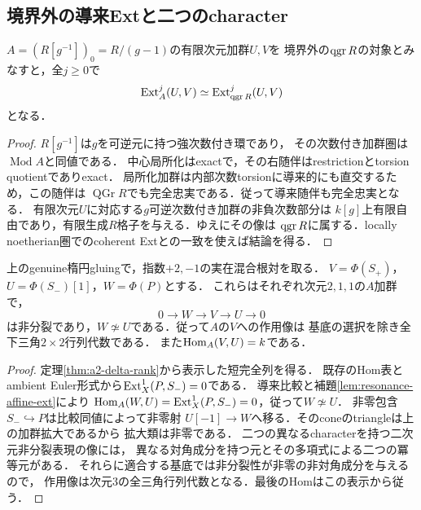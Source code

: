 \subsection{境界外の導来Extと二つのcharacter}
\begin{lemma}[中心局所化による導来Extの保存]
\label{lem:resonance-affine-ext}
$A=(R[g^{-1}])_0=R/(g-1)$の有限次元加群$U,V$を
境界外の$\operatorname{qgr} R$の対象とみなすと，全$j\ge0$で
\[
\operatorname{Ext}^j_A(U,V)\simeq\operatorname{Ext}^j_{\operatorname{qgr} R}(U,V)
\]
となる．
\end{lemma}
\begin{proof}
$R[g^{-1}]$は$g$を可逆元に持つ強次数付き環であり，
その次数付き加群圏は$\operatorname{Mod}A$と同値である．
中心局所化はexactで，その右随伴はrestrictionとtorsion quotientでありexact．
局所化加群は内部次数torsionに導来的にも直交するため，この随伴は
$\operatorname{QGr}R$でも完全忠実である．従って導来随伴も完全忠実となる．
有限次元$U$に対応する$g$可逆次数付き加群の非負次数部分は
$k[g]$上有限自由であり，有限生成$R$格子を与える．ゆえにその像は
$\operatorname{qgr} R$に属する．locally noetherian圏でのcoherent Extとの一致を使えば結論を得る．
\end{proof}

\begin{theorem}[混合$A_2$のcharacter分離と非分裂三角表現]
\label{thm:resonance-affine-triangular}
上のgenuine楕円gluingで，指数$+2,-1$の実在混合根対を取る．
$V=\Phi(S_+)$，$U=\Phi(S_-)[1]$，$W=\Phi(P)$とする．
これらはそれぞれ次元$2,1,1$の$A$加群で，
\[
0\longrightarrow W\longrightarrow V\longrightarrow U\longrightarrow0
\]
は非分裂であり，$W\not\simeq U$である．従って$A$の$V$への作用像は
基底の選択を除き全下三角$2\times2$行列代数である．
また$\operatorname{Hom}_A(V,U)=k$である．
\end{theorem}
\begin{proof}
定理\ref{thm:a2-delta-rank}から表示した短完全列を得る．
既存のHom表とambient Euler形式から$\operatorname{Ext}_X^1(P,S_-)=0$である．
導来比較と補題\ref{lem:resonance-affine-ext}により
$\operatorname{Hom}_A(W,U)=\operatorname{Ext}_X^1(P,S_-)=0$，従って$W\not\simeq U$．
非零包含$S_-\hookrightarrow P$は比較同値によって非零射
$U[-1]\to W$へ移る．そのconeのtriangleは上の加群拡大であるから
拡大類は非零である．
二つの異なるcharacterを持つ二次元非分裂表現の像には，
異なる対角成分を持つ元とその多項式による二つの冪等元がある．
それらに適合する基底では非分裂性が非零の非対角成分を与えるので，
作用像は次元3の全三角行列代数となる．最後のHomはこの表示から従う．
\end{proof}

